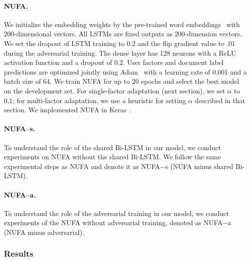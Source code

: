 \paragraph{NUFA.}
We initialize the embedding weights by the pre-trained word embeddings~\cite{mikolov2013distributed, pennington2014glove} with 200-dimensional vectors. All LSTMs are fixed outputs as 200-dimension vectors. We set the dropout of LSTM training to 0.2 and the flip gradient value to .01 during the adversarial training. The dense layer has 128 neurons with a ReLU activation function and a dropout of 0.2. User factors and document label predictions are optimized jointly using Adam~\cite{kingma2014adam} with a learning rate of 0.001 and a batch size of 64. We train NUFA for up to 20 epochs and select the best model on the development set. 
For single-factor adaptation (next section), we set $\alpha$ to 0.1;
for multi-factor adaptation, we use a heuristic for setting $\alpha$ described in that section.
We implemented NUFA in Keras~\cite{chollet2015keras}.

\paragraph{NUFA--s.} 
To understand the role of the shared Bi-LSTM in our model, we conduct experiments on NUFA without the shared Bi-LSTM. We follow the same experimental steps as NUFA and denote it as NUFA$-$s (NUFA minus shared Bi-LSTM). 

\paragraph{NUFA--a.} 
To understand the role of the adversarial training in our model, we conduct experiments of the NUFA without adversarial training, denoted as NUFA$-$a (NUFA minus adversarial).


\subsubsection{Results}


